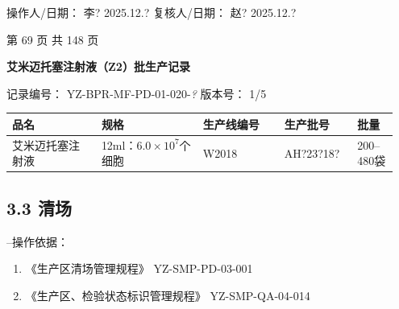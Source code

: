 \documentclass[UTF8,10pt,a4paper,fontset=fandol]{ctexart}
\newcommand{\fieldvalue}[1]{#1}
\newcommand{\handwritten}[1]{#1}
\begin{document}
\vspace{0.3em}

\noindent
操作人/日期：
\fieldvalue{\handwritten{李? 2025.12.?}}
\hfill
复核人/日期：
\fieldvalue{\handwritten{赵? 2025.12.?}}

\vfill

\begin{center}
第 69 页 共 148 页
\end{center}

\newpage

\begin{center}
\textbf{艾米迈托塞注射液（Z2）批生产记录}
\end{center}

\noindent
记录编号：
\fieldvalue{YZ-BPR-MF-PD-01-020-\textit{?}}
\hfill
版本号：
\fieldvalue{1/5}

\begin{tabular}{|p{0.22\linewidth}|p{0.25\linewidth}|p{0.20\linewidth}|p{0.18\linewidth}|p{0.10\linewidth}|}
\hline
品名 & 规格 & 生产线编号 & 生产批号 & 批量 \\
\hline
\fieldvalue{艾米迈托塞注射液}
&
\fieldvalue{12ml：$6.0\times10^{7}$个细胞}
&
\fieldvalue{\handwritten{W2018}}
&
\fieldvalue{\handwritten{AH?23?18?}}
&
\fieldvalue{200--480袋}
\\
\hline
\end{tabular}

\subsection*{3.3 清场}

\noindent
--操作依据：

\begin{enumerate}
\item 《生产区清场管理规程》 \hfill YZ-SMP-PD-03-001
\item 《生产区、检验状态标识管理规程》 \hfill YZ-SMP-QA-04-014
\end{enumerate}
\end{document}
